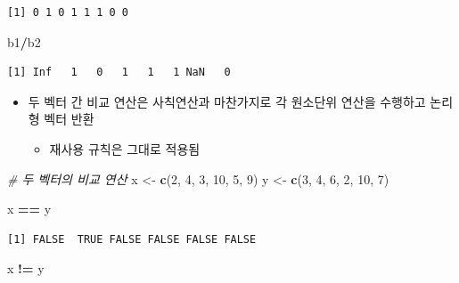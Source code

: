 \documentclass[
  11pt,
]{krantz}
\newenvironment{Shaded}{\begin{snugshade}}{\end{snugshade}}
\newcommand{\CommentTok}[1]{\textcolor[rgb]{0.37,0.37,0.37}{\textit{#1}}}
\newcommand{\DecValTok}[1]{\textcolor[rgb]{0.06,0.06,0.06}{#1}}
\newcommand{\KeywordTok}[1]{\textcolor[rgb]{0.27,0.27,0.27}{\textbf{#1}}}
\newcommand{\NormalTok}[1]{#1}
\newcommand{\OperatorTok}[1]{\textcolor[rgb]{0.43,0.43,0.43}{\textbf{#1}}}
\newcommand{\StringTok}[1]{\textcolor[rgb]{0.5,0.5,0.5}{#1}}
\providecommand{\tightlist}{%
  \setlength{\itemsep}{0pt}\setlength{\parskip}{0pt}}
\begin{document}
\begin{verbatim}
[1] 0 1 0 1 1 1 0 0
\end{verbatim}

\begin{Shaded}
\begin{Highlighting}[]
\NormalTok{b1}\OperatorTok{/}\NormalTok{b2}
\end{Highlighting}
\end{Shaded}

\begin{verbatim}
[1] Inf   1   0   1   1   1 NaN   0
\end{verbatim}

\normalsize

\begin{itemize}
\tightlist
\item
  두 벡터 간 비교 연산은 사칙연산과 마찬가지로 각 원소단위 연산을 수행하고 논리형 벡터 반환

  \begin{itemize}
  \tightlist
  \item
    재사용 규칙은 그대로 적용됨
  \end{itemize}
\end{itemize}

\footnotesize

\begin{Shaded}
\begin{Highlighting}[]
\CommentTok{# 두 벡터의 비교 연산}
\NormalTok{x <-}\StringTok{ }\KeywordTok{c}\NormalTok{(}\DecValTok{2}\NormalTok{, }\DecValTok{4}\NormalTok{, }\DecValTok{3}\NormalTok{, }\DecValTok{10}\NormalTok{, }\DecValTok{5}\NormalTok{, }\DecValTok{9}\NormalTok{)}
\NormalTok{y <-}\StringTok{ }\KeywordTok{c}\NormalTok{(}\DecValTok{3}\NormalTok{, }\DecValTok{4}\NormalTok{, }\DecValTok{6}\NormalTok{, }\DecValTok{2}\NormalTok{, }\DecValTok{10}\NormalTok{, }\DecValTok{7}\NormalTok{)}

\NormalTok{x }\OperatorTok{==}\StringTok{ }\NormalTok{y}
\end{Highlighting}
\end{Shaded}

\begin{verbatim}
[1] FALSE  TRUE FALSE FALSE FALSE FALSE
\end{verbatim}

\begin{Shaded}
\begin{Highlighting}[]
\NormalTok{x }\OperatorTok{!=}\StringTok{ }\NormalTok{y}
\end{Highlighting}
\end{Shaded}
\end{document}
